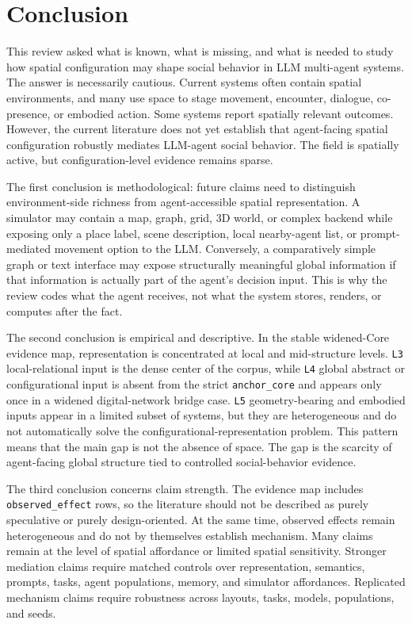 \documentclass[
  twocolumn]{article}
\begin{document}
\section{Conclusion}\label{conclusion}

This review asked what is known, what is missing, and what is needed to
study how spatial configuration may shape social behavior in LLM
multi-agent systems. The answer is necessarily cautious. Current systems
often contain spatial environments, and many use space to stage
movement, encounter, dialogue, co-presence, or embodied action. Some
systems report spatially relevant outcomes. However, the current
literature does not yet establish that agent-facing spatial
configuration robustly mediates LLM-agent social behavior. The field is
spatially active, but configuration-level evidence remains sparse.

The first conclusion is methodological: future claims need to
distinguish environment-side richness from agent-accessible spatial
representation. A simulator may contain a map, graph, grid, 3D world, or
complex backend while exposing only a place label, scene description,
local nearby-agent list, or prompt-mediated movement option to the LLM.
Conversely, a comparatively simple graph or text interface may expose
structurally meaningful global information if that information is
actually part of the agent's decision input. This is why the review
codes what the agent receives, not what the system stores, renders, or
computes after the fact.

The second conclusion is empirical and descriptive. In the stable
widened-Core evidence map, representation is concentrated at local and
mid-structure levels. \texttt{L3} local-relational input is the dense
center of the corpus, while \texttt{L4} global abstract or
configurational input is absent from the strict \texttt{anchor\_core}
and appears only once in a widened digital-network bridge case.
\texttt{L5} geometry-bearing and embodied inputs appear in a limited
subset of systems, but they are heterogeneous and do not automatically
solve the configurational-representation problem. This pattern means
that the main gap is not the absence of space. The gap is the scarcity
of agent-facing global structure tied to controlled social-behavior
evidence.

The third conclusion concerns claim strength. The evidence map includes
\texttt{observed\_effect} rows, so the literature should not be
described as purely speculative or purely design-oriented. At the same
time, observed effects remain heterogeneous and do not by themselves
establish mechanism. Many claims remain at the level of spatial
affordance or limited spatial sensitivity. Stronger mediation claims
require matched controls over representation, semantics, prompts, tasks,
agent populations, memory, and simulator affordances. Replicated
mechanism claims require robustness across layouts, tasks, models,
populations, and seeds.
\end{document}
